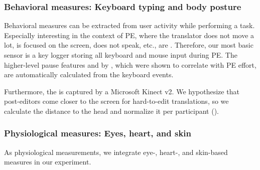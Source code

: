 \documentclass[output=paper]{langsci/langscibook}
\begin{document}
\subsubsection{Behavioral measures: Keyboard typing and body posture}
Behavioral measures can be extracted from user activity while performing a task. Especially interesting in the context of PE, where the translator does not move a lot, is focused on the screen, does not speak, etc., are . Therefore, our most basic sensor is a key logger storing all keyboard and mouse input during PE. The higher-level pause features \apr{} and \pwr{} by \citet{lacruz2012average}, which were shown to correlate with PE effort, are automatically calculated from the keyboard events.


Furthermore, the  is captured by a Microsoft Kinect v2. We hypothesize that post-editors come closer to the screen for hard-to-edit translations, so we calculate the distance to the head and normalize it per participant (\headdist{}).


\subsubsection{Physiological measures: Eyes, heart, and skin}
As physiological measurements, we integrate eye-, heart-, and skin-based measures in our experiment.
\end{document}
